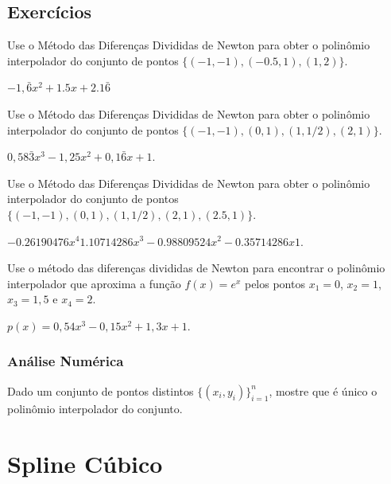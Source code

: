 \subsection{Exercícios}

\begin{exer}
  Use o Método das Diferenças Divididas de Newton para obter o polinômio interpolador do conjunto de pontos $\{(-1, -1), (-0.5, 1), (1, 2)\}$.
\end{exer}
\begin{resp}
  $-1,\bar{6}x^2 + 1.5x + 2.1\bar{6}$
\end{resp}

\begin{exer}
  Use o Método das Diferenças Divididas de Newton para obter o polinômio interpolador do conjunto de pontos $\{(-1, -1), (0, 1), (1, 1/2), (2, 1)\}$.
\end{exer}
\begin{resp}
  $0,58\bar{3}x^3 - 1,25x^2 + 0,1\bar{6}x + 1$. 
\end{resp}

\begin{exer}
  Use o Método das Diferenças Divididas de Newton para obter o polinômio interpolador do conjunto de pontos $\{(-1, -1), (0, 1), (1, 1/2), (2, 1), (2.5, 1)\}$.
\end{exer}
\begin{resp}
  $-0.26190476x^4  1.10714286x^3 -0.98809524x^2 -0.35714286x  1$.  
\end{resp}

\begin{exer}
  Use o método das diferenças divididas de Newton para encontrar o polinômio interpolador que aproxima a função $f(x)=e^{x}$ pelos pontos $x_1=0$, $x_2=1$, $x_3=1,5$ e $x_4=2$.
\end{exer}
\begin{resp}
$p(x) = 0,54x^3 - 0,15x^2 + 1,3x + 1$.
\end{resp}

\subsubsection{Análise Numérica}

\begin{exer}\label{cap_interp_sec_difdiv:exer:pinterp_unico}
  Dado um conjunto de pontos distintos $\{(x_i, y_i)\}_{i=1}^n$, mostre que é único o polinômio interpolador do conjunto.
\end{exer}


\section{Spline Cúbico}\label{cap_interp_sec_splines}

